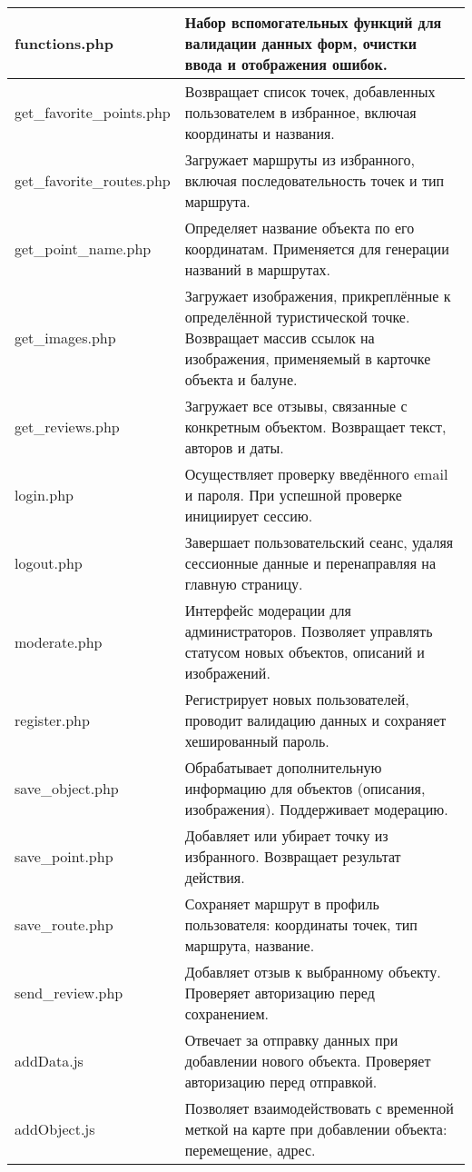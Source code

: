\begin{xltabular}{\textwidth}{|p{4cm}|X|}
\hline functions.php & Набор вспомогательных функций для валидации данных форм, очистки ввода и отображения ошибок.\\
\hline get\_favorite\_\-points.php & Возвращает список точек, добавленных пользователем в избранное, включая координаты и названия.\\
\hline get\_favorite\_\-routes.php & Загружает маршруты из избранного, включая последовательность точек и тип маршрута.\\
\hline get\_point\_name.php & Определяет название объекта по его координатам. Применяется для генерации названий в маршрутах.\\
\hline get\_images.php & Загружает изображения, прикреплённые к определённой туристической точке. Возвращает массив ссылок на изображения, применяемый в карточке объекта и балуне.\\
\hline get\_reviews.php & Загружает все отзывы, связанные с конкретным объектом. Возвращает текст, авторов и даты.\\
\hline login.php & Осуществляет проверку введённого email и пароля. При успешной проверке инициирует сессию.\\
\hline logout.php & Завершает пользовательский сеанс, удаляя сессионные данные и перенаправляя на главную страницу.\\
\hline moderate.php & Интерфейс модерации для администраторов. Позволяет управлять статусом новых объектов, описаний и изображений.\\
\hline register.php & Регистрирует новых пользователей, проводит валидацию данных и сохраняет хешированный пароль.\\
\hline save\_object.php & Обрабатывает дополнительную информацию для объектов (описания, изображения). Поддерживает модерацию.\\
\hline save\_point.php & Добавляет или убирает точку из избранного. Возвращает результат действия.\\
\hline save\_route.php & Сохраняет маршрут в профиль пользователя: координаты точек, тип маршрута, название.\\
\hline send\_review.php & Добавляет отзыв к выбранному объекту. Проверяет авторизацию перед сохранением.\\
\hline addData.js & Отвечает за отправку данных при добавлении нового объекта. Проверяет авторизацию перед отправкой.\\
\hline addObject.js & Позволяет взаимодействовать с временной меткой на карте при добавлении объекта: перемещение, адрес.\\

\end{xltabular}
